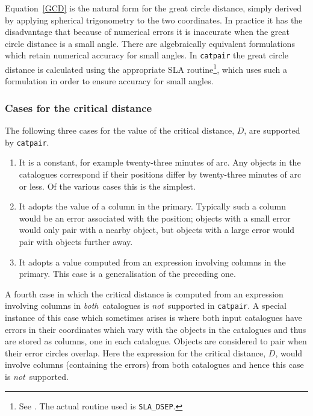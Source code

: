 \documentclass[twoside,11pt]{starlink}
\begin{document}
Equation~\ref{GCD} is the natural form for the great circle distance,
simply derived by applying spherical trigonometry to the two
coordinates. In practice it has the disadvantage that because of
numerical errors it is inaccurate when the great circle distance is a
small angle. There are algebraically equivalent formulations which
retain numerical accuracy for small angles. In \texttt{catpair} the great
circle distance is calculated using the appropriate SLA routine\footnote{See
\cite{SUN67}. The actual routine used is \texttt{SLA\_DSEP}.}, which uses such a formulation in order to ensure accuracy for
small angles.

\subsubsection{\label{CRIT_DIST}Cases for the critical distance}

The following three cases for the value of the critical distance,
$D$, are supported by \texttt{catpair}.

\begin{enumerate}

  \item It is a constant, for example twenty-three minutes of arc.  Any
   objects in the catalogues correspond if their positions differ by
   twenty-three minutes of arc or less.  Of the various cases this is
   the simplest.

  \item It adopts the value of a column in the primary. Typically such a
   column would be an error associated with the position; objects with a
   small error would only pair with a nearby object, but objects with a
   large error would pair with objects further away.

  \item It adopts a value computed from an expression involving columns
   in the primary. This case is a generalisation of the preceding one.

\end{enumerate}

A fourth case in which the critical distance is computed from an
expression involving columns in \textit{both}\, catalogues is \textit{not}\,
supported in \texttt{catpair}. A special instance of this case which sometimes
arises is where both input catalogues have errors in their coordinates which
vary with the objects in the catalogues and thus are stored as columns, one
in each catalogue. Objects are considered to pair when their error circles
overlap. Here the expression for the critical distance, $D$, would involve
columns (containing the errors) from both catalogues and hence this case is
\textit{not}\, supported.
\end{document}
